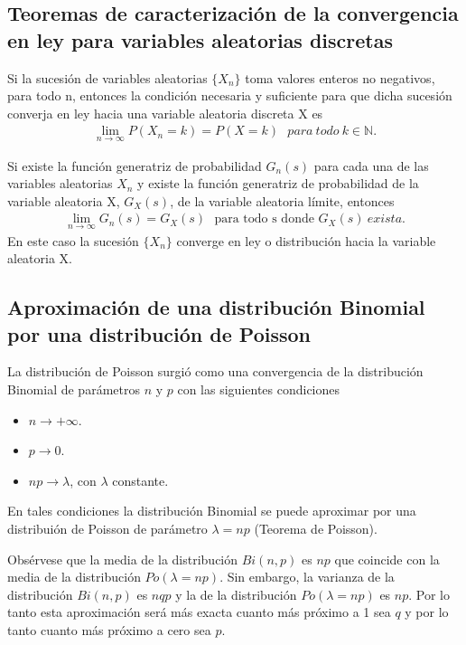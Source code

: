 \subsection{Teoremas de caracterización de la convergencia en ley para variables aleatorias discretas}

\begin{teo}
    Si la sucesión de variables aleatorias $\{X_n\}$ toma valores enteros no negativos, para todo n, entonces la condición necesaria y suficiente para que dicha sucesión converja en ley hacia una variable aleatoria discreta X es
    \begin{align*}
        \lim_{n \to \infty}{P(X_n = k) = P(X = k)} \ \ \ para \ todo \ k \in \mathbb{N}.
    \end{align*}
\end{teo}

\begin{teo}
    Si existe la función generatriz de probabilidad $G_n(s)$ para cada una de las variables aleatorias $X_n$ y existe la función generatriz de probabilidad de la variable aleatoria X, $G_X(s)$, de la variable aleatoria límite, entonces
    \begin{align*}
        \lim_{n \to \infty}{G_n(s) = G_X(s)} \ \ \ \text{para todo s donde } G_X(s) \ exista.
    \end{align*}
    En este caso la sucesión $\{X_n\}$ converge en ley o distribución hacia la variable aleatoria X.
\end{teo}

\subsection{Aproximación de una distribución Binomial por una distribución de Poisson}

La distribución de Poisson surgió como una convergencia de la distribución Binomial de parámetros $n$ y $p$ con las siguientes condiciones
\begin{itemize}
    \item $n \to +\infty$.
    \item $p \to 0$.
    \item $np \to \lambda$, con $\lambda$ constante.
\end{itemize}
En tales condiciones la distribución Binomial se puede aproximar por una distribuión de Poisson de parámetro $\lambda = np$ (Teorema de Poisson).

Obsérvese que la media de la distribución $Bi(n,p)$ es $np$ que coincide con la media de la distribución $Po(\lambda = np)$. Sin embargo, la varianza de la distribución $Bi(n,p)$ es $nqp$ y la de la distribución $Po(\lambda = np)$ es $np$. Por lo tanto esta aproximación será más exacta cuanto más próximo a 1 sea $q$ y por lo tanto cuanto más próximo a cero sea $p$.

